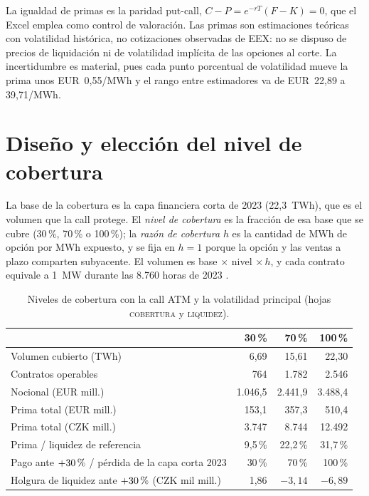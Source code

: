 \documentclass[11pt,letterpaper]{article}
\theoremstyle{plain}
\theoremstyle{definition}
\theoremstyle{remark}
\numberwithin{equation}{section}
\newcommand{\pc}{\mbox{\,\%}}
\begin{document}
La igualdad de primas es la paridad put-call, $C-P=e^{-rT}(F-K)=0$, que el Excel emplea como control de valoración. Las primas son estimaciones teóricas con volatilidad histórica, no cotizaciones observadas de EEX: no se dispuso de precios de liquidación ni de volatilidad implícita de las opciones al corte. La incertidumbre es material, pues cada punto porcentual de volatilidad mueve la prima unos EUR~0,55/MWh y el rango entre estimadores va de EUR~22,89 a 39,71/MWh.

\section{Diseño y elección del nivel de cobertura}

La base de la cobertura es la capa financiera corta de 2023 (22,3~TWh), que es el volumen que la call protege. El \emph{nivel de cobertura} es la fracción de esa base que se cubre (30\pc{}, 70\pc{} o 100\pc{}); la \emph{razón de cobertura} $h$ es la cantidad de MWh de opción por MWh expuesto, y se fija en $h=1$ porque la opción y las ventas a plazo comparten subyacente. El volumen es base $\times$ nivel $\times\,h$, y cada contrato equivale a 1~MW durante las 8.760 horas de 2023 \cite{eex}.

\begin{table}[H]
    \centering\small
    \caption{Niveles de cobertura con la call ATM y la volatilidad principal (hojas \textsc{cobertura} y \textsc{liquidez}).}\label{tab:niveles}
    \begin{tabular}{@{}lrrr@{}}
    \toprule
        & 30\pc{} & 70\pc{} & 100\pc{}\\
    \midrule
        Volumen cubierto (TWh) & 6,69 & 15,61 & 22,30\\
        Contratos operables & 764 & 1.782 & 2.546\\
        Nocional (EUR mill.) & 1.046,5 & 2.441,9 & 3.488,4\\
        Prima total (EUR mill.) & 153,1 & 357,3 & 510,4\\
        Prima total (CZK mill.) & 3.747 & 8.744 & 12.492\\
        Prima / liquidez de referencia & 9,5\pc{} & 22,2\pc{} & 31,7\pc{}\\
        Pago ante $+30\pc{}$ / pérdida de la capa corta 2023 & 30\pc{} & 70\pc{} & 100\pc{}\\
        Holgura de liquidez ante $+30\pc{}$ (CZK mil mill.) & 1,86 & $-3{,}14$ & $-6{,}89$\\
    \bottomrule
    \end{tabular}
\end{table}
\end{document}
